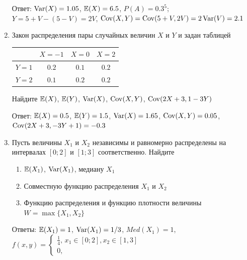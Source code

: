 \documentclass[12pt, a4paper]{article}\usepackage[]{graphicx}\usepackage[]{color}
\begin{document}
\begin{enumerate}
Ответ: $\operatorname{Var}(X)=1.05$, $\mathbb{E}(X)=6.5$, $P(A)=0.3^5$; $Y=5+V-(5-V)=2V$, $\operatorname{Cov}(X,Y)=\operatorname{Cov}(5+V,2V)=2\operatorname{Var}(V)=2.1$

\item Закон распределения пары случайных величин $X$ и $Y$  и  задан таблицей

\begin{tabular}{c|ccc}
 & $X=-1$ & $X=0$ & $X=2$ \\
\hline
$Y=1$ & $0.2$ & $0.1$ & $0.2$ \\
$Y=2$ & $0.1$ & $0.2$ & $0.2$ \\
\end{tabular}


Найдите $\mathbb{E}(X)$, $\mathbb{E}(Y)$, $\operatorname{Var}(X)$, $\operatorname{Cov}(X,Y)$, $\operatorname{Cov}(2X+3,1-3Y)$

Ответ: $\mathbb{E}(X)=0.5$, $\mathbb{E}(Y)=1.5$, $\operatorname{Var}(X)=1.65$, $\operatorname{Cov}(X,Y)=0.05$, $\operatorname{Cov}(2X+3,-3Y+1)=-0.3$

\item Пусть величины $X_1$ и $X_2$ независимы и равномерно распределены на интервалах $[0;2]$ и $[1;3]$ соответственно. Найдите
\begin{enumerate}
\item $\mathbb{E}(X_1)$, $\operatorname{Var}(X_1)$, медиану $X_1$
\item Совместную функцию распределения $X_1$ и $X_2$
\item Функцию распределения и функцию плотности величины $W=\max\{X_1,X_2\}$
\end{enumerate}

Ответы: $\mathbb{E}(X_1)=1$, $\operatorname{Var}(X_1)=1/3$, $Med(X_1)=1$, $f(x,y)=\begin{cases}
\frac{1}{4}, \, x_1\in [0;2], x_2\in [1,3] \\
0,
\end{cases}$
\end{enumerate}
\end{document}
